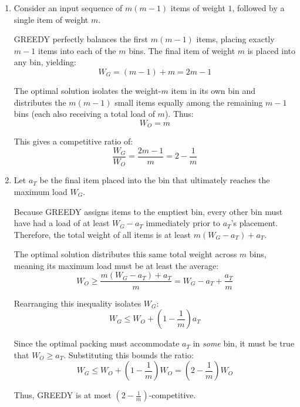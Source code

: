 \documentclass[14pt]{extreport}
\begin{document}
    \begin{enumerate}[label=(\arabic*)]
        \item Consider an input sequence of $m(m - 1)$ items of weight $1$, followed by a single item of weight $m$.

        \vspace{2mm}
        \textsc{GREEDY} perfectly balances the first $m(m - 1)$ items, placing exactly $m - 1$ items into each of the $m$ bins. The final item of weight $m$ is placed into any bin, yielding:
        $$W_G = (m - 1) + m = 2m - 1$$

        \vspace{2mm}
        The optimal solution isolates the weight-$m$ item in its own bin and distributes the $m(m - 1)$ small items equally among the remaining $m - 1$ bins (each also receiving a total load of $m$). Thus:
        $$W_O = m$$

        \vspace{2mm}
        This gives a competitive ratio of:
        $$\frac{W_G}{W_O} = \frac{2m - 1}{m} = 2 - \frac{1}{m}$$

        \item
        Let $a_T$ be the final item placed into the bin that ultimately reaches the maximum load $W_G$.

        \vspace{2mm}
        Because \textsc{GREEDY} assigns items to the emptiest bin, every other bin must have had a load of at least $W_G - a_T$ immediately prior to $a_T$'s placement. Therefore, the total weight of all items is at least $m(W_G - a_T) + a_T$.

        \vspace{2mm}
        The optimal solution distributes this same total weight across $m$ bins, meaning its maximum load must be at least the average:
        $$W_O \ge \frac{m(W_G - a_T) + a_T}{m} = W_G - a_T + \frac{a_T}{m}$$

        \vspace{2mm}
        Rearranging this inequality isolates $W_G$:
        $$W_G \le W_O + \left(1 - \frac{1}{m}\right)a_T$$

        \vspace{2mm}
        Since the optimal packing must accommodate $a_T$ in \textit{some} bin, it must be true that $W_O \ge a_T$. Substituting this bounds the ratio:
        $$W_G \le W_O + \left(1 - \frac{1}{m}\right)W_O = \left(2 - \frac{1}{m}\right)W_O$$

        \vspace{2mm}
        Thus, \textsc{GREEDY} is at most $(2 - \frac{1}{m})$-competitive.
    \end{enumerate}
\end{document}

